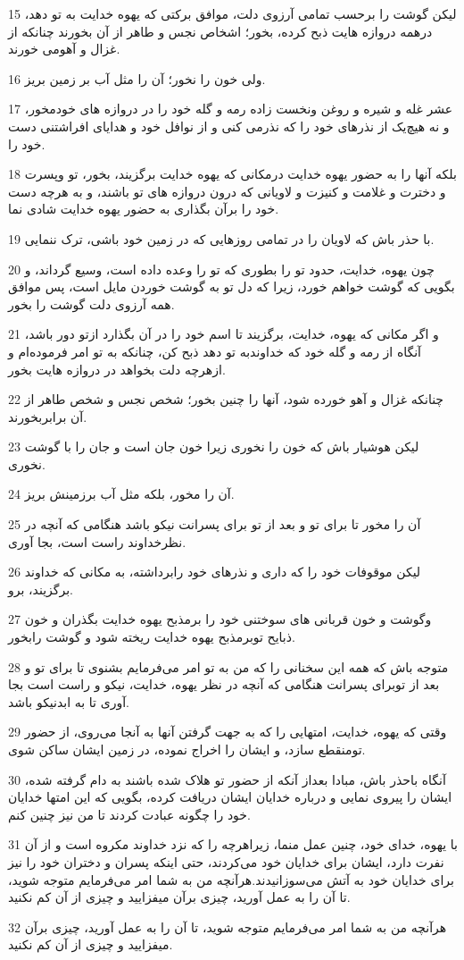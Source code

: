 \par 15 لیکن گوشت را برحسب تمامی آرزوی دلت، موافق برکتی که یهوه خدایت به تو دهد، درهمه دروازه هایت ذبح کرده، بخور؛ اشخاص نجس و طاهر از آن بخورند چنانکه از غزال و آهومی خورند.
\par 16 ولی خون را نخور؛ آن را مثل آب بر زمین بریز.
\par 17 عشر غله و شیره و روغن ونخست زاده رمه و گله خود را در دروازه های خودمخور، و نه هیچ‌یک از نذرهای خود را که نذرمی کنی و از نوافل خود و هدایای افراشتنی دست خود را.
\par 18 بلکه آنها را به حضور یهوه خدایت درمکانی که یهوه خدایت برگزیند، بخور، تو وپسرت و دخترت و غلامت و کنیزت و لاویانی که درون دروازه های تو باشند، و به هرچه دست خود را برآن بگذاری به حضور یهوه خدایت شادی نما.
\par 19 با حذر باش که لاویان را در تمامی روزهایی که در زمین خود باشی، ترک ننمایی.
\par 20 چون یهوه، خدایت، حدود تو را بطوری که تو را وعده داده است، وسیع گرداند، و بگویی که گوشت خواهم خورد، زیرا که دل تو به گوشت خوردن مایل است، پس موافق همه آرزوی دلت گوشت را بخور.
\par 21 و اگر مکانی که یهوه، خدایت، برگزیند تا اسم خود را در آن بگذارد ازتو دور باشد، آنگاه از رمه و گله خود که خداوندبه تو دهد ذبح کن، چنانکه به تو امر فرموده‌ام و ازهرچه دلت بخواهد در دروازه هایت بخور.
\par 22 چنانکه غزال و آهو خورده شود، آنها را چنین بخور؛ شخص نجس و شخص طاهر از آن برابربخورند.
\par 23 لیکن هوشیار باش که خون را نخوری زیرا خون جان است و جان را با گوشت نخوری.
\par 24 آن را مخور، بلکه مثل آب برزمینش بریز.
\par 25 آن را مخور تا برای تو و بعد از تو برای پسرانت نیکو باشد هنگامی که آنچه در نظرخداوند راست است، بجا آوری.
\par 26 لیکن موقوفات خود را که داری و نذرهای خود رابرداشته، به مکانی که خداوند برگزیند، برو.
\par 27 وگوشت و خون قربانی های سوختنی خود را برمذبح یهوه خدایت بگذران و خون ذبایح توبرمذبح یهوه خدایت ریخته شود و گوشت رابخور.
\par 28 متوجه باش که همه این سخنانی را که من به تو امر می‌فرمایم بشنوی تا برای تو و بعد از توبرای پسرانت هنگامی که آنچه در نظر یهوه، خدایت، نیکو و راست است بجا آوری تا به ابدنیکو باشد.
\par 29 وقتی که یهوه، خدایت، امتهایی را که به جهت گرفتن آنها به آنجا می‌روی، از حضور تومنقطع سازد، و ایشان را اخراج نموده، در زمین ایشان ساکن شوی.
\par 30 آنگاه باحذر باش، مبادا بعداز آنکه از حضور تو هلاک شده باشند به دام گرفته شده، ایشان را پیروی نمایی و درباره خدایان ایشان دریافت کرده، بگویی که این امتها خدایان خود را چگونه عبادت کردند تا من نیز چنین کنم.
\par 31 با یهوه، خدای خود، چنین عمل منما، زیراهرچه را که نزد خداوند مکروه است و از آن نفرت دارد، ایشان برای خدایان خود می‌کردند، حتی اینکه پسران و دختران خود را نیز برای خدایان خود به آتش می‌سوزانیدند.هر‌آنچه من به شما امر می‌فرمایم متوجه شوید، تا آن را به عمل آورید، چیزی برآن میفزایید و چیزی از آن کم نکنید.
\par 32 هر‌آنچه من به شما امر می‌فرمایم متوجه شوید، تا آن را به عمل آورید، چیزی برآن میفزایید و چیزی از آن کم نکنید.
 
